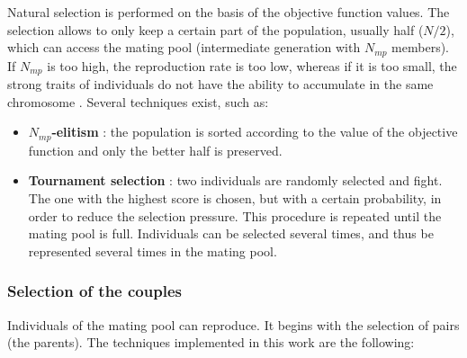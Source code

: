 \documentclass{ametsoc}
\begin{document}
Natural selection is performed on the basis of the objective function values. The selection allows to only keep a certain part of the population, usually half ($N/2$), which can access the mating pool (intermediate generation with $N_{mp}$ members). If $N_{mp}$ is too high, the reproduction rate is too low, whereas if it is too small, the strong traits of individuals do not have the ability to accumulate in the same chromosome \citep{Haupt2004}. Several techniques exist, such as:

\begin{itemize}
	\item \textbf{$N_{mp}$-elitism} \citep{Michalewicz1996}: the population is sorted according to the value of the objective function and only the better half is preserved. 
		
	\item \textbf{Tournament selection} \citep{Michalewicz1996, Zitzler2004a}: two individuals are randomly selected and fight. The one with the highest score is chosen, but with a certain probability, in order to reduce the selection pressure. This procedure is repeated until the mating pool is full. Individuals can be selected several times, and thus be represented several times in the mating pool.
\end{itemize}


\subsubsection{Selection of the couples}

Individuals of the mating pool can reproduce. It begins with the selection of pairs (the parents). The techniques implemented in this work are the following:
\end{document}
